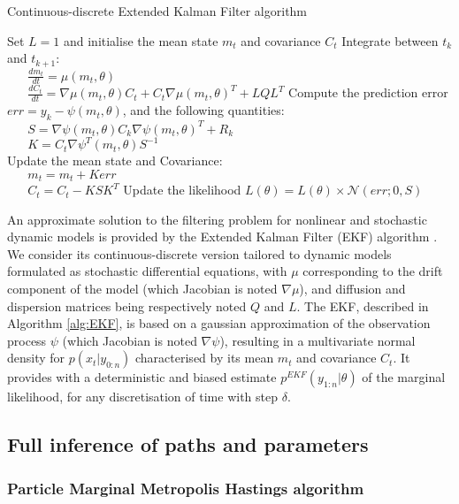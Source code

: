 \documentclass[a4paper,11pt]{article}
\begin{document}
\begin{algorithm}
\caption{Continuous-discrete Extended Kalman Filter algorithm}
\label{alg:EKF}
\begin{algorithmic}
\STATE Set $L=1$ and initialise the mean state $m_t$ and covariance $C_t$
		\STATE Integrate between $t_k$ and $t_{k+1}$:\\
			$\;\;\;\;\;\;\frac{dm_t}{dt}=\mu(m_t,\theta)$\\
			$\;\;\;\;\;\;\frac{dC_t}{dt}=\nabla\mu(m_t,\theta)C_t + C_t \nabla\mu(m_t,\theta)^T+LQL^T$
		\STATE Compute the prediction error $err = y_k- \psi(m_t,\theta)$, and the following quantities:\\
			$\;\;\;\;\;\;S=\nabla\psi(m_t,\theta)C_k \nabla\psi(m_t,\theta)^T+R_k$	\\
			$\;\;\;\;\;\;K=C_t\nabla\psi^T(m_t,\theta)S^{-1}$\\
		\STATE Update the mean state and Covariance:\\
			$\;\;\;\;\;\;m_t = m_t + K err$\\
			$\;\;\;\;\;\;C_t = C_t - KSK^T$	
		\STATE Update the likelihood $L(\theta) = L(\theta)\times\mathcal{N}(err;0,S)$
	\ENDFOR
\ENDFOR		
\end{algorithmic}
\end{algorithm}

An approximate solution to the filtering problem for nonlinear and stochastic dynamic models is provided by the Extended Kalman Filter (EKF) algorithm \citep{Jazwinski1970,Sarkka2006}. We consider its continuous-discrete version tailored  to dynamic models formulated as stochastic differential equations, with $\mu$  corresponding to the drift component of the model (which Jacobian is noted $\nabla\mu$), and diffusion and dispersion matrices being respectively noted $Q$ and $L$. The EKF, described in Algorithm \ref{alg:EKF},  is based on a gaussian approximation of the observation process $\psi$ (which Jacobian is noted $\nabla\psi$), resulting in a multivariate normal density for $p(x_t|y_{0:n})$ characterised by its mean $m_t$ and covariance $C_t$. It provides with a deterministic and biased estimate $p^{EKF}(y_{1:n}|\theta)$ of the marginal likelihood, for any discretisation of time with step $\delta$.  


\subsection{Full inference of paths and parameters}
\subsubsection{Particle Marginal Metropolis Hastings algorithm}
\end{document}
